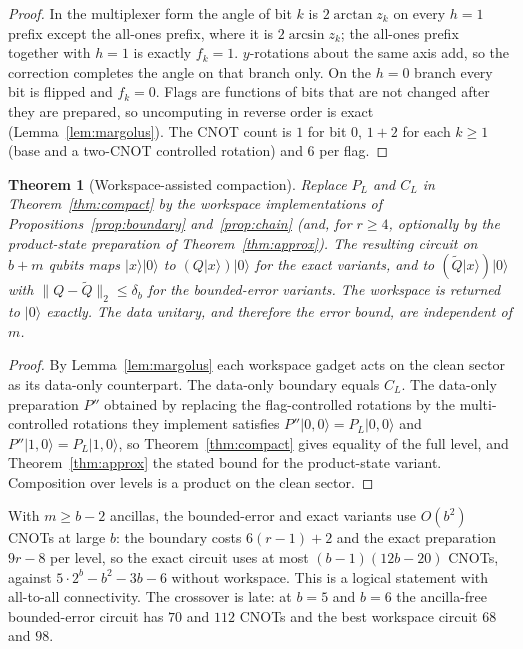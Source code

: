 \documentclass[11pt]{article}
\newtheorem{theorem}{Theorem}
\newcommand{\ket}[1]{\lvert #1\rangle}
\begin{document}
\begin{proof}
In the multiplexer form the angle of bit $k$ is $2\arctan z_k$ on every $h=1$ prefix except the all-ones prefix, where it is $2\arcsin z_k$; the all-ones prefix together with $h=1$ is exactly $f_k=1$. $y$-rotations about the same axis add, so the correction completes the angle on that branch only. On the $h=0$ branch every bit is flipped and $f_k=0$. Flags are functions of bits that are not changed after they are prepared, so uncomputing in reverse order is exact (Lemma~\ref{lem:margolus}). The CNOT count is $1$ for bit $0$, $1+2$ for each $k\ge1$ (base and a two-CNOT controlled rotation) and $6$ per flag.
\end{proof}
\begin{theorem}[Workspace-assisted compaction]\label{thm:workspace}
Replace $P_L$ and $C_L$ in Theorem~\ref{thm:compact} by the workspace implementations of Propositions~\ref{prop:boundary} and~\ref{prop:chain} (and, for $r\ge4$, optionally by the product-state preparation of Theorem~\ref{thm:approx}). The resulting circuit on $b+m$ qubits maps $\ket x\ket0$ to $(Q\ket x)\ket0$ for the exact variants, and to $(\widetilde Q\ket x)\ket0$ with $\|Q-\widetilde Q\|_2\le\delta_b$ for the bounded-error variants. The workspace is returned to $\ket0$ exactly. The data unitary, and therefore the error bound, are independent of $m$.
\end{theorem}
\begin{proof}
By Lemma~\ref{lem:margolus} each workspace gadget acts on the clean sector as its data-only counterpart. The data-only boundary equals $C_L$. The data-only preparation $P''$ obtained by replacing the flag-controlled rotations by the multi-controlled rotations they implement satisfies $P''\ket{0,0}=P_L\ket{0,0}$ and $P''\ket{1,0}=P_L\ket{1,0}$, so Theorem~\ref{thm:compact} gives equality of the full level, and Theorem~\ref{thm:approx} the stated bound for the product-state variant. Composition over levels is a product on the clean sector.
\end{proof}
With $m\ge b-2$ ancillas, the bounded-error and exact variants use $O(b^2)$ CNOTs at large $b$: the boundary costs $6(r-1)+2$ and the exact preparation $9r-8$ per level, so the exact circuit uses at most $(b-1)(12b-20)$ CNOTs, against $5\cdot2^b-b^2-3b-6$ without workspace. This is a logical statement with all-to-all connectivity. The crossover is late: at $b=5$ and $b=6$ the ancilla-free bounded-error circuit has $70$ and $112$ CNOTs and the best workspace circuit $68$ and $98$.
\end{document}
